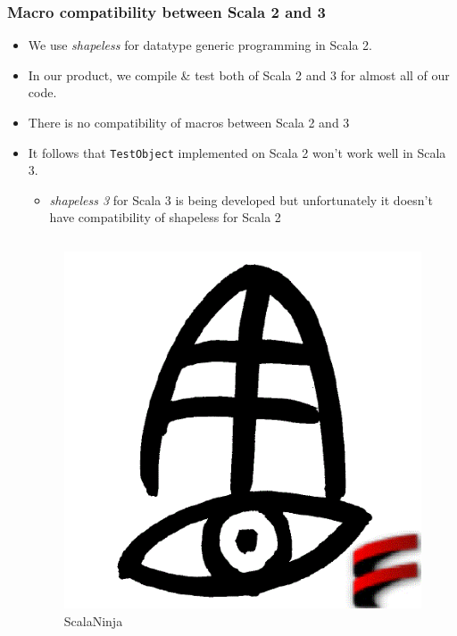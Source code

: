 \begin{frame}
  \frametitle{Macro compatibility between Scala 2 and 3}

  \begin{itemize}
    \item We use \emph{shapeless}\cite{shapeless_github} for datatype generic programming in Scala 2.

    \pause
    \item In our product, we compile \& test both of Scala 2 and 3 for almost all of our code.

    \pause
    \item There is no compatibility of macros between Scala 2 and 3 

    \pause
    \item It follows that \lstinline|TestObject| implemented on Scala 2 won't work well in Scala 3.
    \begin{itemize}
      \item \emph{shapeless 3}\cite{shapeless-3_github} for Scala 3 is being developed but unfortunately
      it doesn't have compatibility of shapeless for Scala 2
    \end{itemize}

    \pause
    \begin{columns}
      \begin{column}{0.2\textwidth}
        \begin{figure}[h]
          \includegraphics[width=0.6\columnwidth]{img/xuwei.png}
          \caption{ScalaNinja}
          \label{fig:scalaninja}
        \end{figure}
      \end{column}
    \end{columns}
  \end{itemize}


\end{frame}

